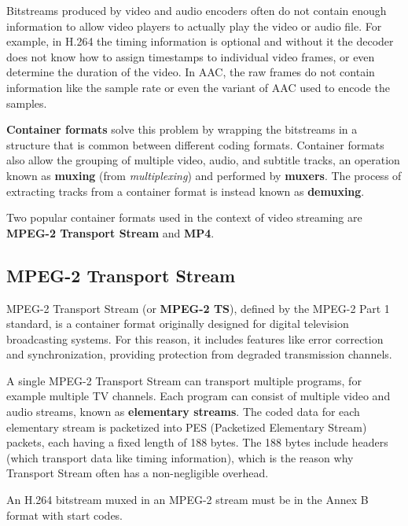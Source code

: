 Bitstreams produced by video and audio encoders often do not contain enough information to allow video players to actually play the video or audio file. For example, in H.264 the timing information is optional and without it the decoder does not know how to assign timestamps to individual video frames, or even determine the duration of the video.\cite{h264itu} In AAC, the raw frames do not contain information like the sample rate or even the variant of AAC used to encode the samples.\cite{aac}

\textbf{Container formats} solve this problem by wrapping the bitstreams in a structure that is common between different coding formats. Container formats also allow the grouping of multiple video, audio, and subtitle tracks, an operation known as \textbf{muxing} (from \textit{multiplexing}) and performed by \textbf{muxers}. The process of extracting tracks from a container format is instead known as \textbf{demuxing}.

Two popular container formats used in the context of video streaming are \textbf{MPEG-2 Transport Stream} and \textbf{MP4}.

\subsection{MPEG-2 Transport Stream}
\label{sec:bg/containers/mpeg2ts}

MPEG-2 Transport Stream (or \textbf{MPEG-2 TS}), defined by the MPEG-2 Part 1 standard, is a container format originally designed for digital television broadcasting systems. For this reason, it includes features like error correction and synchronization, providing protection from degraded transmission channels.

A single MPEG-2 Transport Stream can transport multiple programs, for example multiple TV channels. Each program can consist of multiple video and audio streams, known as \textbf{elementary streams}. The coded data for each elementary stream is packetized into PES (Packetized Elementary Stream) packets, each having a fixed length of 188 bytes. The 188 bytes include headers (which transport data like timing information), which is the reason why Transport Stream often has a non-negligible overhead.\cite{mpeg2ts}


An H.264 bitstream muxed in an MPEG-2 stream must be in the Annex B format with start codes.

